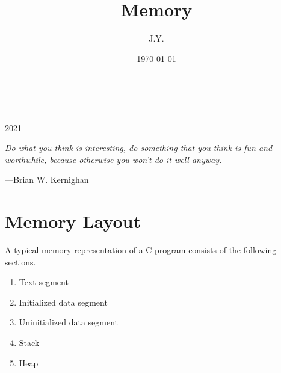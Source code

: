 \documentclass[a5paper,pagesize,10pt,bibtotoc,pointlessnumbers,
normalheadings,DIV=9,twoside=false]{scrbook}
\title{Memory}
\author{J.Y.}
\date{\today}
\begin{document}
\begin{titlepage}
		\\
			
		\vspace{10mm}
		\\
		\vspace{\fill}
		\centering \large{2021}
\end{titlepage}


\newpage{}
\thispagestyle {empty}

\vspace*{2cm}

\begin{center}
	\Large{\parbox{10cm}{
		\begin{raggedright}
		{\Large 
			\textit{Do what you think is interesting, 
			do something that you think is fun and worthwhile, 
			because otherwise you won’t do it well anyway.}
		}
	
		\vspace{.5cm}\hfill{---Brian W. Kernighan}
		\end{raggedright} 
	}
}
\end{center}

\newpage



\section{Memory Layout}
A typical memory representation of a C program consists of the following sections.
\begin{enumerate}
	\item Text segment
	\item Initialized data segment
	\item Uninitialized data segment
	\item Stack
	\item Heap
\end{enumerate}
\end{document}
